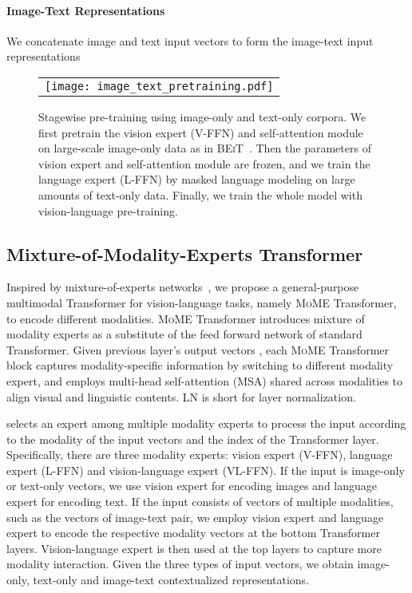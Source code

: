 \documentclass{article}
\newcommand\mome{\textsc{MoME}}
\newcommand\beit{\textsc{BEiT}}
\begin{document}
\paragraph{Image-Text Representations}
We concatenate image and text input vectors to form the image-text input representations 


\begin{figure*}[t]
\begin{center}
\begin{tabular}{c}
\texttt{[image: image\_text\_pretraining.pdf]}
\end{tabular}
\end{center}
\caption{
Stagewise pre-training using image-only and text-only corpora.
We first pretrain the vision expert (V-FFN) and self-attention module on large-scale image-only data as in \beit{}~\citep{beit}.
Then the parameters of vision expert and self-attention module are frozen, and we train the language expert (L-FFN) by masked language modeling on large amounts of text-only data.
Finally, we train the whole model with vision-language pre-training.
}
\label{fig:image_text_training}
\end{figure*}


\subsection{Mixture-of-Modality-Experts Transformer}
\label{sec:mome}

Inspired by mixture-of-experts networks~\citep{moe,switchtransformer}, we propose a general-purpose multimodal Transformer for vision-language tasks, namely \mome{} Transformer, to encode different modalities.
\mome{} Transformer introduces mixture of modality experts as a substitute of the feed forward network of standard Transformer.
Given previous layer's output vectors , each \mome{} Transformer block captures modality-specific information by switching to different modality expert, and employs multi-head self-attention (MSA) shared across modalities to align visual and linguistic contents. LN is short for layer normalization.

 selects an expert among multiple modality experts to process the input according to the modality of the input vectors  and the index of the Transformer layer.
Specifically, there are three modality experts: vision expert (V-FFN), language expert (L-FFN) and vision-language expert (VL-FFN).
If the input is image-only or text-only vectors, we use vision expert for encoding images and language expert for encoding text.
If the input consists of vectors of multiple modalities, such as the vectors of image-text pair, we employ vision expert and language expert to encode the respective modality vectors at the bottom Transformer layers.
Vision-language expert is then used at the top layers to capture more modality interaction.
Given the three types of input vectors, we obtain image-only, text-only and image-text contextualized representations.
\end{document}
